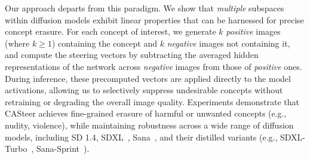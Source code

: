 Our approach departs from this paradigm. We show that \textit{multiple} subspaces within diffusion models exhibit linear properties that can be harnessed for precise concept erasure. %
For each concept of interest, we generate 
$k$ \textit{positive} images (where $k \geq 1$)  containing the concept and $k$ \textit{negative} images not containing it, and compute the steering vectors by subtracting the averaged hidden representations of the network across \textit{negative} images from those of \textit{positive} ones.
%
During inference, these precomputed vectors are applied directly to the model activations, allowing us to selectively suppress undesirable concepts without retraining or degrading the overall image quality.
%
Experiments demonstrate that CASteer achieves fine-grained erasure of harmful or unwanted concepts (e.g., nudity, violence), while maintaining robustness across a wide range of diffusion models, including SD 1.4, SDXL~\cite{DBLP:conf/iclr/PodellELBDMPR24}, Sana~\cite{xie2025sana}, and their distilled variants (e.g., SDXL-Turbo~\cite{DBLP:conf/eccv/SauerLBR24}, Sana-Sprint~\cite{chen2025sana-sprint}).


%
%
%
%

